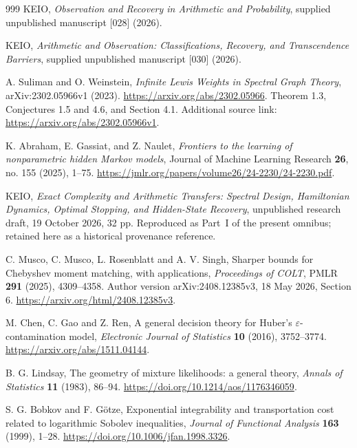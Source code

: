 \documentclass[11pt,a4paper]{article}
\theoremstyle{definition}
\theoremstyle{remark}
\numberwithin{equation}{section}
\begin{document}
\begin{thebibliography}{999}
KEIO,
\emph{Observation and Recovery in Arithmetic and Probability},
supplied unpublished manuscript [028] (2026).

KEIO,
\emph{Arithmetic and Observation: Classifications, Recovery, and Transcendence Barriers},
supplied unpublished manuscript [030] (2026).

A. Suliman and O. Weinstein,
\emph{Infinite Lewis Weights in Spectral Graph Theory},
arXiv:2302.05966v1 (2023).
\url{https://arxiv.org/abs/2302.05966}.
Theorem 1.3, Conjectures 1.5 and 4.6, and Section 4.1.
Additional source link: \url{https://arxiv.org/abs/2302.05966v1}.

K. Abraham, E. Gassiat, and Z. Naulet,
\emph{Frontiers to the learning of nonparametric hidden Markov models},
Journal of Machine Learning Research \textbf{26}, no. 155 (2025), 1--75.
\url{https://jmlr.org/papers/volume26/24-2230/24-2230.pdf}.

KEIO,
\emph{Exact Complexity and Arithmetic Transfers: Spectral Design,
Hamiltonian Dynamics, Optimal Stopping, and Hidden-State Recovery},
unpublished research draft, 19 October 2026, 32 pp.
Reproduced as Part~I of the present omnibus; retained here as a historical provenance reference.

C. Musco, C. Musco, L. Rosenblatt and A. V. Singh,
Sharper bounds for Chebyshev moment matching, with applications,
\emph{Proceedings of COLT}, PMLR \textbf{291} (2025), 4309--4358.
Author version arXiv:2408.12385v3, 18 May 2026, Section 6.
\url{https://arxiv.org/html/2408.12385v3}.

M. Chen, C. Gao and Z. Ren,
A general decision theory for Huber's $\varepsilon$-contamination model,
\emph{Electronic Journal of Statistics} \textbf{10} (2016), 3752--3774.
\url{https://arxiv.org/abs/1511.04144}.

B. G. Lindsay, The geometry of mixture likelihoods: a general theory,
\emph{Annals of Statistics} \textbf{11} (1983), 86--94.
\url{https://doi.org/10.1214/aos/1176346059}.

S. G. Bobkov and F. G\"otze,
Exponential integrability and transportation cost related to logarithmic
Sobolev inequalities, \emph{Journal of Functional Analysis}
\textbf{163} (1999), 1--28.
\url{https://doi.org/10.1006/jfan.1998.3326}.


\end{thebibliography}
\end{document}
